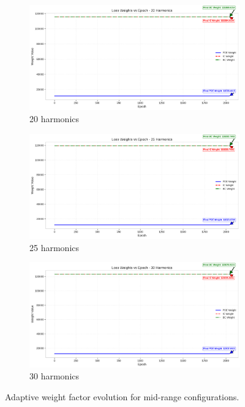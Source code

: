 \begin{figure}[H]
    \centering
    \begin{subfigure}[b]{0.32\textwidth}
        \centering
        \includegraphics[width=\textwidth]{figures/weight_factors_20h.png}
        \caption{20 harmonics}
    \end{subfigure}
    \hfill
    \begin{subfigure}[b]{0.32\textwidth}
        \centering
        \includegraphics[width=\textwidth]{figures/weight_factors_25h.png}
        \caption{25 harmonics}
    \end{subfigure}
    \hfill
    \begin{subfigure}[b]{0.32\textwidth}
        \centering
        \includegraphics[width=\textwidth]{figures/weight_factors_30h.png}
        \caption{30 harmonics}
    \end{subfigure}
    \caption{Adaptive weight factor evolution for mid-range configurations.}
    \label{fig:weights_mid}
\end{figure}

